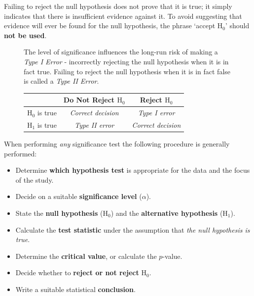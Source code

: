 \documentclass[
  11pt,
]{book}
\begin{document}
Failing to reject the null hypothesis does not prove that it is true; it simply indicates that there is insufficient evidence against it. To avoid suggesting that evidence will ever be found for the null hypothesis, the phrase `accept \(\text{H}_\text{0}\)' should \textbf{not be used}.

\begin{figure}[H]
  \centering
\begin{minipage}{.45\textwidth}

The level of significance influences the long-run risk of making a \textit{Type I Error} - incorrectly rejecting the null hypothesis when it is in fact true. Failing to reject the null hypothesis when it is in fact false is called a \textit{Type II Error}.

\end{minipage}%
  \centering
\begin{minipage}{.0\textwidth}
  \centering
  
  
\end{minipage}%
  \centering
\begin{minipage}{.55\textwidth}
  \centering

\begin{flushright}
  \begin{tabular}{| c|c c |} 
  \hline
      & Do Not Reject $\text{H}_\text{0}$ & Reject $\text{H}_\text{0}$\\ 
  \hline
     $\text{H}_\text{0}$ is true & \textit{Correct decision} & \textit{Type I error}\\ 
     $\text{H}_\text{1}$ is true & \textit{Type II error} & \textit{Correct decision}\\ 
  \hline
\end{tabular}
\end{flushright}

\end{minipage}
\end{figure}

When performing \emph{any} significance test the following procedure is generally performed:

\begin{itemize}[itemsep=0pt]
    \item Determine \textbf{which hypothesis test} is appropriate for the data and the focus of the study.
    \item Decide on a suitable \textbf{significance level} ($\alpha$).
    \item State the \textbf{null hypothesis} ($\text{H}_\text{0}$) and the \textbf{alternative hypothesis} ($\text{H}_\text{1}$).
    \item Calculate the \textbf{test statistic} under the assumption that \textit{the null hypothesis is true}.
    \item Determine the \textbf{critical value}, or calculate the $p$-value.
    \item Decide whether to \textbf{reject or not reject} $\text{H}_\text{0}$.
    \item Write a suitable statistical \textbf{conclusion}.
\end{itemize}
\end{document}
